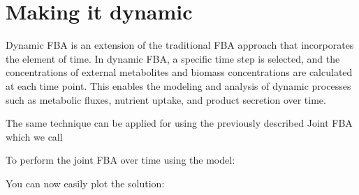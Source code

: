 \documentclass[letterpaper,10pt,english]{sphinxmanual}
\begin{document}
\section{Making it dynamic}
\label{\detokenize{5_djoint/home:making-it-dynamic}}
\sphinxAtStartPar
Dynamic FBA is an extension of the traditional FBA approach that incorporates the element of
time. In dynamic FBA, a specific time step  is selected, and the concentrations of external
metabolites and biomass concentrations are calculated at each time point.
This enables the modeling and analysis of dynamic processes such as metabolic fluxes,
nutrient uptake, and product secretion over time.

\sphinxAtStartPar
The same technique can be applied for using the previously described Joint FBA which we call

\sphinxAtStartPar
To perform the joint FBA over time using the  model:

\begin{sphinxVerbatim}[commandchars=\\\{\}]
\end{sphinxVerbatim}

\sphinxAtStartPar
You can now easily plot the solution:
\end{document}
